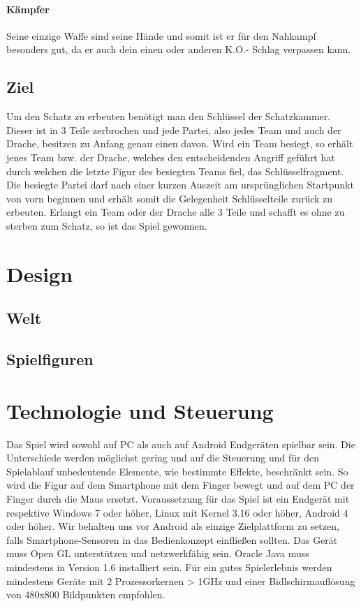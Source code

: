 \documentclass[10pt,a4paper,notitlepage]{report}
\begin{document}
\begin{flushleft}
\subsubsection{Kämpfer}
Seine einzige Waffe sind seine Hände und somit ist er für den Nahkampf besonders gut, da er auch dein einen oder anderen K.O.- Schlag verpassen kann.\\
\section{Ziel}
Um den Schatz zu erbeuten benötigt man den Schlüssel der Schatzkammer. Dieser ist in 3 Teile zerbrochen und jede Partei, also jedes Team und auch der Drache, besitzen zu Anfang genau einen davon. Wird ein Team besiegt, so erhält jenes Team bzw. der Drache, welches den entscheidenden Angriff geführt hat durch welchen die letzte Figur des besiegten Teams fiel, das Schlüsselfragment. Die besiegte Partei darf nach einer kurzen Auszeit am ursprünglichen Startpunkt von vorn beginnen und erhält somit die Gelegenheit Schlüsselteile zurück zu erbeuten. Erlangt ein Team oder der Drache alle 3 Teile und schafft es ohne zu sterben zum Schatz, so ist das Spiel gewonnen.\\

\chapter{Design}
\section{Welt}
\section{Spielfiguren}

\chapter{Technologie und Steuerung}
Das Spiel wird sowohl auf PC als auch auf Android Endgeräten spielbar sein. Die Unterschiede werden möglichst gering und auf die Steuerung und für den Spielablauf unbedeutende Elemente, wie bestimmte Effekte, beschränkt sein. So wird die Figur auf dem Smartphone mit dem Finger bewegt und auf dem PC der Finger durch die Maus ersetzt.
Voraussetzung für das Spiel ist ein Endgerät mit respektive Windows 7 oder höher, Linux mit Kernel 3.16 oder höher, Android 4 oder höher. Wir behalten uns vor Android als einzige Zielplattform zu setzen, falls Smartphone-Sensoren in das Bedienkonzept einfließen sollten. Das Gerät muss Open GL unterstützen und netzwerkfähig sein. Oracle Java muss mindestens in Version 1.6 installiert sein. Für ein gutes Spielerlebnis werden mindestens Geräte mit 2 Prozessorkernen > 1GHz und einer Bidlschirmauflösung von 480x800 Bildpunkten empfohlen.


\end{flushleft}
\end{document}
